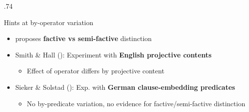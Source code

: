 \documentclass[final, table, cmyk]{beamer}
\newlength{\colwidth}
\newlength{\vboxsep}
\begin{document}
\begin{frame}[t]
\begin{columns}[t]
\begin{column}{.74\colwidth}
			\vspace{\vboxsep}
			\begin{normalbox}{Hints at by-operator variation}
					\begin{minipage}{1.08\linewidth}
						\begin{itemize}
							\item \citet{karttunen_observations_1971} proposes \textbf{factive vs semi-factive} distinction
							\item Smith \& Hall (\citeyear{smith_relationship_2014}): Experiment with \textbf{English projective contents}
							\begin{itemize}
								\item Effect of operator differs by projective content
							\end{itemize}
							\item Sieker \& Solstad (\citeyear{sieker_projective_2022}): Exp. with \textbf{German clause-embedding predicates}
							\begin{itemize}
								\item No by-predicate variation, no evidence for factive/semi-factive distinction
							\end{itemize}
						\end{itemize}
					\end{minipage}
				
				
				\begin{center}
\end{center}
\end{normalbox}
\end{column}
\end{columns}
\end{frame}
\end{document}

